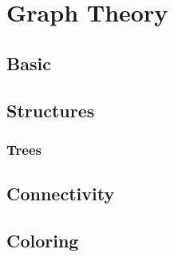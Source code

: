 %
%
%

\tableofcontents

\chapter{Graph Theory}

\section{Basic}


\section{Structures}


\subsection{Trees}


\section{Connectivity}


\section{Coloring}


